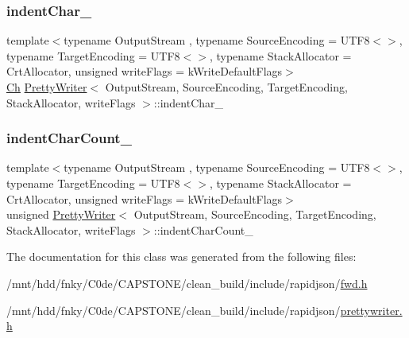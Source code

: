 \subsubsection{\texorpdfstring{indent\+Char\+\_\+}{indentChar\_}}
{\footnotesize\ttfamily template$<$typename Output\+Stream , typename Source\+Encoding  = U\+T\+F8$<$$>$, typename Target\+Encoding  = U\+T\+F8$<$$>$, typename Stack\+Allocator  = Crt\+Allocator, unsigned write\+Flags = k\+Write\+Default\+Flags$>$ \\
\hyperlink{classPrettyWriter_ae35c89bda4c5d59d3ff6efcf2fea45a3}{Ch} \hyperlink{classPrettyWriter}{Pretty\+Writer}$<$ Output\+Stream, Source\+Encoding, Target\+Encoding, Stack\+Allocator, write\+Flags $>$\+::indent\+Char\+\_\+\hspace{0.3cm}{\ttfamily [protected]}}

\mbox{\label{classPrettyWriter_a7d00b9716ef3cd7e34ae1b744c968f13}} 
\subsubsection{\texorpdfstring{indent\+Char\+Count\+\_\+}{indentCharCount\_}}
{\footnotesize\ttfamily template$<$typename Output\+Stream , typename Source\+Encoding  = U\+T\+F8$<$$>$, typename Target\+Encoding  = U\+T\+F8$<$$>$, typename Stack\+Allocator  = Crt\+Allocator, unsigned write\+Flags = k\+Write\+Default\+Flags$>$ \\
unsigned \hyperlink{classPrettyWriter}{Pretty\+Writer}$<$ Output\+Stream, Source\+Encoding, Target\+Encoding, Stack\+Allocator, write\+Flags $>$\+::indent\+Char\+Count\+\_\+\hspace{0.3cm}{\ttfamily [protected]}}



The documentation for this class was generated from the following files\+:\begin{DoxyCompactItemize}
\item 
/mnt/hdd/fnky/\+C0de/\+C\+A\+P\+S\+T\+O\+N\+E/clean\+\_\+build/include/rapidjson/\hyperlink{fwd_8h}{fwd.\+h}\item 
/mnt/hdd/fnky/\+C0de/\+C\+A\+P\+S\+T\+O\+N\+E/clean\+\_\+build/include/rapidjson/\hyperlink{prettywriter_8h}{prettywriter.\+h}\end{DoxyCompactItemize}
